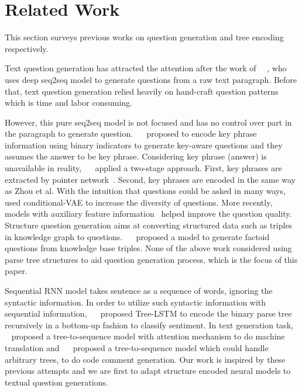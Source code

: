 \section{Related Work}
This section surveys previous works on question generation and tree encoding
respectively.

Text question generation has attracted the attention 
after the work of ~\citeauthor{du2017learning}~, who uses deep seq2seq model 
to generate questions from a raw text paragraph. 
Before that, text question generation relied heavily on hand-craft 
question patterns~\cite{HeilmanS10,LabutovBV15,MostowC09} which is time and 
labor consuming. 

However, this pure seq2seq model is not focused and 
has no control over part in the paragraph to generate question. 
~\citeauthor{zhou2017neural}~ proposed to encode 
key phrase information using binary indicators to generate 
key-aware questions and they assumes the answer to be key phrase. 
Considering key phrase (answer) is unavailable in reality, 
~\citeauthor{SubramanianWYT17}~ applied 
a two-stage approach. First, key phrases are extracted by 
pointer network~\cite{ptrnet}. Second, 
key phrases are encoded in the same way as 
Zhou et al. With the intuition that questions could be asked in many ways, 
~\citeauthor{Yao2018vae}~ used conditional-VAE to 
increase the diversity of questions. More recently, models with 
auxiliary feature information~\cite{HarrisonW18} helped improve 
the question quality. Structure question generation aims at 
converting structured data such as triples in knowledge graph to questions. 
~\citeauthor{SerbanGGACCB16}~ proposed a model to generate factoid questions from knowledge base triples.  None of the above work
considered using parse tree structures to aid question generation process,
which is the focus of this paper.

Sequential RNN model takes sentence as a sequence of words, 
ignoring the syntactic information. In order to utilize
such syntactic information with sequential information, 
~\citeauthor{tai2015improved}~ proposed Tree-LSTM to 
encode the binary parse tree recursively in a bottom-up fashion to 
classify sentiment. In text generation task, 
\citeauthor{eriguchi2016tree}~ 
proposed a tree-to-sequence model with attention mechanism to do 
machine translation and 
~\citeauthor{liang2018automatic}~ proposed a 
tree-to-sequence model which could handle arbitrary trees, 
to do code comment generation. Our work is inspired by these previous
attempts and we are first to adapt structure encoded neural models to
textual question generations.